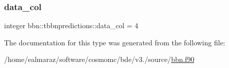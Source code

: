 \subsubsection{\texorpdfstring{data\+\_\+col}{data\_col}}
{\footnotesize\ttfamily integer bbn\+::tbbnpredictions\+::data\+\_\+col = 4}



The documentation for this type was generated from the following file\+:\begin{DoxyCompactItemize}
\item 
/home/ealmaraz/software/cosmomc/bde/v3./source/\mbox{\hyperlink{bbn_8f90}{bbn.\+f90}}\end{DoxyCompactItemize}
